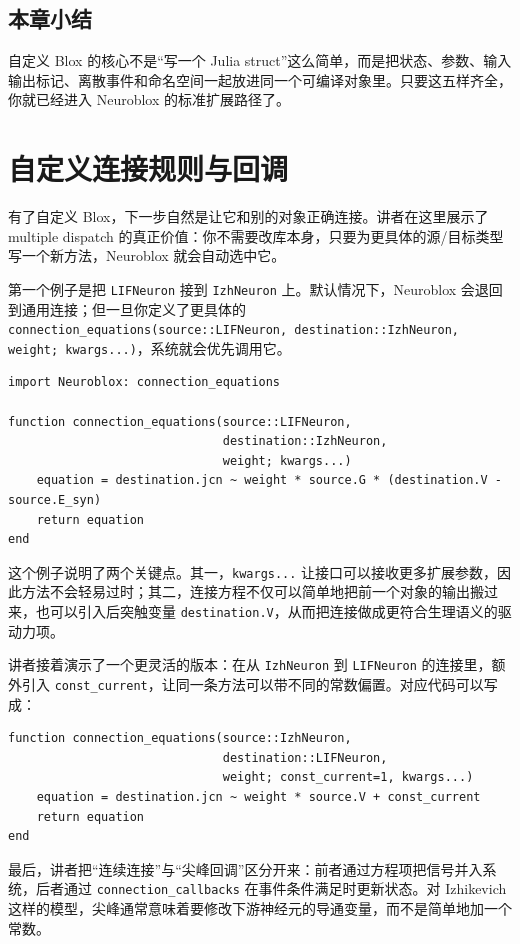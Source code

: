 \documentclass[a4paper]{article}
\begin{document}
\subsection{本章小结}
自定义 Blox 的核心不是“写一个 Julia struct”这么简单，而是把状态、参数、输入输出标记、离散事件和命名空间一起放进同一个可编译对象里。只要这五样齐全，你就已经进入 Neuroblox 的标准扩展路径了。

\section{自定义连接规则与回调}
有了自定义 Blox，下一步自然是让它和别的对象正确连接。讲者在这里展示了 multiple dispatch 的真正价值：你不需要改库本身，只要为更具体的源/目标类型写一个新方法，Neuroblox 就会自动选中它。

第一个例子是把 \texttt{LIFNeuron} 接到 \texttt{IzhNeuron} 上。默认情况下，Neuroblox 会退回到通用连接；但一旦你定义了更具体的 \texttt{connection\_equations(source::LIFNeuron, destination::IzhNeuron, weight; kwargs...)}，系统就会优先调用它。

\begin{lstlisting}[caption={为更具体的类型组合定义连接方程}]
import Neuroblox: connection_equations

function connection_equations(source::LIFNeuron,
                              destination::IzhNeuron,
                              weight; kwargs...)
    equation = destination.jcn ~ weight * source.G * (destination.V - source.E_syn)
    return equation
end
\end{lstlisting}

这个例子说明了两个关键点。其一，\texttt{kwargs...} 让接口可以接收更多扩展参数，因此方法不会轻易过时；其二，连接方程不仅可以简单地把前一个对象的输出搬过来，也可以引入后突触变量 \texttt{destination.V}，从而把连接做成更符合生理语义的驱动力项。

讲者接着演示了一个更灵活的版本：在从 \texttt{IzhNeuron} 到 \texttt{LIFNeuron} 的连接里，额外引入 \texttt{const\_current}，让同一条方法可以带不同的常数偏置。对应代码可以写成：
\begin{lstlisting}[caption={用额外 keyword 参数扩展连接方程}]
function connection_equations(source::IzhNeuron,
                              destination::LIFNeuron,
                              weight; const_current=1, kwargs...)
    equation = destination.jcn ~ weight * source.V + const_current
    return equation
end
\end{lstlisting}

最后，讲者把“连续连接”与“尖峰回调”区分开来：前者通过方程项把信号并入系统，后者通过 \texttt{connection\_callbacks} 在事件条件满足时更新状态。对 Izhikevich 这样的模型，尖峰通常意味着要修改下游神经元的导通变量，而不是简单地加一个常数。
\end{document}
